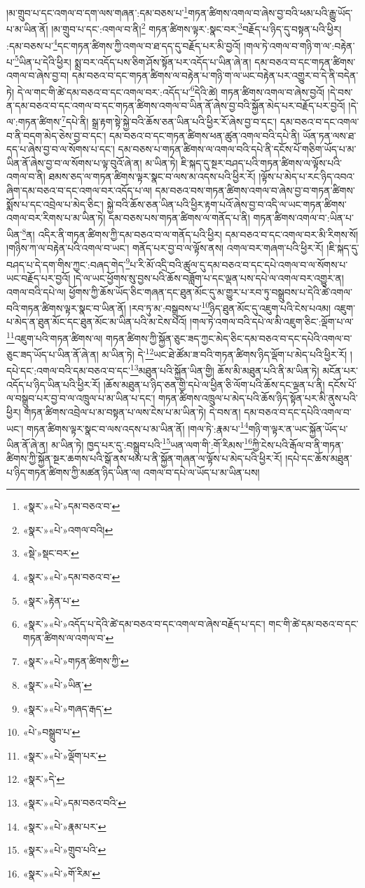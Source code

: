 །མ་གྲུབ་པ་དང་འགལ་བ་དག་ལས་གཞན་:དམ་བཅས་པ་\footnote{«སྣར་»«པེ་»དམ་བཅའ་བ་}གཏན་ཚིགས་འགལ་བ་ཞེས་བྱ་བའི་ཕམ་པའི་རྒྱུ་ཡོད་པ་མ་ཡིན་ནོ། །མ་གྲུབ་པ་དང་:འགལ་བ་ནི།\footnote{«སྣར་»«པེ་»འགལ་བའི།} གཏན་ཚིགས་ལྟར་:སྣང་བར་\footnote{«སྡེ་»སྡང་བར་}བརྗོད་པ་ཉིད་དུ་བསྟན་པའི་ཕྱིར། :དམ་བཅས་པ་\footnote{«སྣར་»«པེ་»དམ་བཅའ་བ་}དང་གཏན་ཚིགས་ཀྱི་འགལ་བ་ཐ་དད་དུ་བརྗོད་པར་མི་བྱའོ། །གལ་ཏེ་འགལ་བ་གཉི་ག་ལ་:བརྟེན་པ་\footnote{«སྣར་»རྟེན་པ་}ཡིན་པ་དེའི་ཕྱིར། སྨྲ་བར་འདོད་པས་ཅིག་ཤོས་སྟོན་པར་འདོད་པ་ཡིན་ཞེ་ན། དམ་བཅའ་བ་དང་གཏན་ཚིགས་འགལ་བ་ཞེས་བྱ་བ། དམ་བཅའ་བ་དང་གཏན་ཚིགས་ལ་བརྟེན་པ་གཉི་ག་ལ་ཡང་བརྟེན་པར་འགྱུར་བ་དེ་ནི་བདེན་ཏེ། དེ་ལ་གང་གི་ཚེ་དམ་བཅའ་བ་དང་འགལ་བར་:འདོད་པ་\footnote{«སྣར་»«པེ་»འདོད་པ་དེའི་ཚེ་དམ་བཅའ་བ་དང་འགལ་བ་ཞེས་བརྗོད་པ་དང་། གང་གི་ཚེ་དམ་བཅའ་བ་དང་གཏན་ཚིགས་ལ་འགལ་བ་}དེའི་ཚེ། གཏན་ཚིགས་འགལ་བ་ཞེས་བྱའོ། །དེ་བས་ན་དམ་བཅའ་བ་དང་འགལ་བ་དང་གཏན་ཚིགས་འགལ་བ་ཡིན་ནོ་ཞེས་བྱ་བའི་སྐྱོན་མེད་པར་བརྗོད་པར་བྱའོ། །དེ་ལ་:གཏན་ཚིགས་\footnote{«སྣར་»«པེ་»གཏན་ཚིགས་ཀྱི་}དཔེ་ནི། སྒྲ་རྟག་སྟེ་སྐྱེ་བའི་ཆོས་ཅན་ཡིན་པའི་ཕྱིར་རོ་ཞེས་བྱ་བ་དང་། དམ་བཅའ་བ་དང་འགལ་བ་ནི་བདག་མེད་ཅེས་བྱ་བ་དང་། དམ་བཅའ་བ་དང་གཏན་ཚིགས་ཕན་ཚུན་འགལ་བའི་དཔེ་ནི། ཡོན་ཏན་ལས་ཐ་དད་པ་ཞེས་བྱ་བ་ལ་སོགས་པ་དང་། དམ་བཅས་པ་གཏན་ཚིགས་ལ་འགལ་བའི་དཔེ་ནི་དངོས་པོ་གཅིག་ཡོད་པ་མ་ཡིན་ནོ་ཞེས་བྱ་བ་ལ་སོགས་པ་ལྟ་བུའོ་ཞེ་ན། མ་ཡིན་ཏེ། ཇི་སྐད་དུ་སྔར་བཤད་པའི་གཏན་ཚིགས་ལ་ལྟོས་པའི་འགལ་བ་ནི། ཐམས་ཅད་ལ་གཏན་ཚིགས་ལྟར་སྣང་བ་ལས་མ་འདས་པའི་ཕྱིར་རོ། །ལྟོས་པ་མེད་པ་རང་ཉིད་འབའ་ཞིག་དམ་བཅའ་བ་དང་འགལ་བར་འདོད་པ་ལ། དམ་བཅའ་བས་གཏན་ཚིགས་འགལ་བ་ཞེས་བྱ་བ་གཏན་ཚིགས་སྨོས་པ་དང་འབྲེལ་པ་མེད་ཅིང་། སྐྱེ་བའི་ཆོས་ཅན་ཡིན་པའི་ཕྱིར་རྟག་པའོ་ཞེས་བྱ་བ་འདི་ལ་ཡང་གཏན་ཚིགས་འགལ་བར་རིགས་པ་མ་ཡིན་ཏེ། དམ་བཅས་པས་གཏན་ཚིགས་ལ་གནོད་པ་ནི། གཏན་ཚིགས་འགལ་བ་:ཡིན་པ་ཡིན་\footnote{«སྣར་»«པེ་»ཡིན་}ན། འདིར་ནི་གཏན་ཚིགས་ཀྱི་དམ་བཅའ་བ་ལ་གནོད་པའི་ཕྱིར། དམ་བཅའ་བ་དང་འགལ་བར་མི་རིགས་སོ། །གཉིས་ཀ་ལ་བརྟེན་པའི་འགལ་བ་ཡང་། གནོད་པར་བྱ་བ་ལ་ལྟོས་ནས། འགལ་བར་གཞག་པའི་ཕྱིར་རོ། །ཇི་སྐད་དུ་བཤད་པ་དེ་དག་གིས་ཀྱང་:བཞད་གེད་\footnote{«སྣར་»«པེ་»གཞད་རྒད་}པ་རི་མོ་འདྲི་བའི་ཚུལ་དུ་དམ་བཅའ་བ་དང་དཔེ་འགལ་བ་ལ་སོགས་པ་ཡང་བརྗོད་པར་བྱའོ། །དེ་ལ་ཡང་ཕྱོགས་སུ་བྱས་པའི་ཆོས་བཟློག་པ་དང་ལྡན་པས་དཔེ་ལ་འགལ་བར་འགྱུར་ན། འགལ་བའི་དཔེ་ལ། ཕྱོགས་ཀྱི་ཆོས་ཡོད་ཅིང་གཞན་དང་ཐུན་མོང་དུ་མ་གྱུར་པ་རབ་ཏུ་བསྒྲུབས་པ་དེའི་ཚེ་འགལ་བའི་གཏན་ཚིགས་ལྟར་སྣང་བ་ཡིན་ནོ། །རབ་ཏུ་མ་:བསྒྲུབས་པ་\footnote{«པེ་»བསྒྲུབ་པ་}ཉིད་ཐུན་མོང་དུ་འཇུག་པའི་ངེས་པའམ། འཇུག་པ་མེད་ན་ཐུན་མོང་དང་ཐུན་མོང་མ་ཡིན་པའི་མ་ངེས་པའོ། །གལ་ཏེ་འགལ་བའི་དཔེ་ལ་མི་འཇུག་ཅིང་:ལྡོག་པ་ལ་\footnote{«སྣར་»«པེ་»ལྡོག་པར་}འཇུག་པའི་གཏན་ཚིགས་ལ། གཏན་ཚིགས་ཀྱི་སྐྱོན་ཅུང་ཟད་ཀྱང་མེད་ཅིང་དམ་བཅའ་བ་དང་དཔེའི་འགལ་བ་ཅུང་ཟད་ཡོད་པ་ཡིན་ནོ་ཞེ་ན། མ་ཡིན་ཏེ། དེ་\footnote{«སྣར་»དེ་}ཡང་ཐེ་ཚོམ་ཟ་བའི་གཏན་ཚིགས་ཉིད་ལྡོག་པ་མེད་པའི་ཕྱིར་རོ། །དཔེ་དང་:འགལ་བའི་དམ་བཅའ་བ་དང་\footnote{«སྣར་»«པེ་»དམ་བཅའ་བའི་}མཐུན་པའི་སྐྱོན་ཡིན་གྱི། ཆོས་མི་མཐུན་པའི་ནི་མ་ཡིན་ཏེ། མངོན་པར་འདོད་པ་ཉིད་ཡིན་པའི་ཕྱིར་རོ། །ཆོས་མཐུན་པ་ཉིད་ཅན་གྱི་དཔེ་ལ་ཕྱིན་ཅི་ལོག་པའི་ཆོས་དང་ལྡན་པ་ནི། དངོས་པོ་ལ་བསྒྲུབ་པར་བྱ་བ་ལ་འཁྲུལ་པ་མ་ཡིན་པ་དང་། གཏན་ཚིགས་འཁྲུལ་པ་མེད་པའི་ཆོས་ཉིད་སྟོན་པར་མི་ནུས་པའི་ཕྱིར། གཏན་ཚིགས་འབྲེལ་པ་མ་བསྟན་པ་ལས་ངེས་པ་མ་ཡིན་ཏེ། དེ་བས་ན། དམ་བཅའ་བ་དང་དཔེའི་འགལ་བ་ཡང་། གཏན་ཚིགས་ལྟར་སྣང་བ་ལས་འདས་པ་མ་ཡིན་ནོ། །གལ་ཏེ་:རྣམ་པ་\footnote{«སྣར་»«པེ་»རྣམ་པར་}གཉི་ག་ལྟར་ན་ཡང་སྐྱོན་ཡོད་པ་ཡིན་ནོ་ཞེ་ན། མ་ཡིན་ཏེ། ཁྱད་པར་དུ་:བསྒྲུབ་པའི་\footnote{«སྣར་»«པེ་»གྲུབ་པའི་}ཡན་ལག་གི་:གོ་རིམས་\footnote{«སྣར་»«པེ་»གོ་རིམ་}ཀྱི་ངེས་པའི་རྒོལ་བ་ནི་གཏན་ཚིགས་ཀྱི་སྐྱོན་སྔར་ཆགས་པའི་སྒོ་ནས་ཕམ་པ་ནི་སྐྱོན་གཞན་ལ་ལྟོས་པ་མེད་པའི་ཕྱིར་རོ། །དཔེ་དང་ཆོས་མཐུན་པ་ཉིད་གཏན་ཚིགས་ཀྱི་མཚན་ཉིད་ཡིན་ལ། འགལ་བ་དཔེ་ལ་ཡོད་པ་མ་ཡིན་པས། 